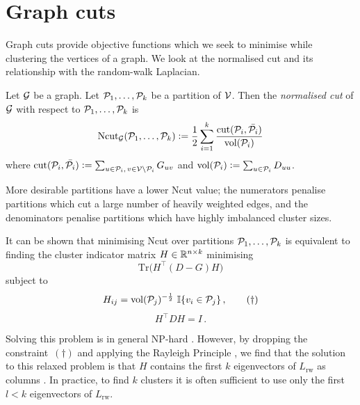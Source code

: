 \section{Graph cuts} \label{sec:spectral_graph_cut}

Graph cuts provide objective functions which we seek to minimise while clustering the vertices of a graph.
We look at the normalised cut and its relationship with the random-walk Laplacian.

\begin{definition}
Let $\mathcal{G}$ be a graph. Let $ \mathcal{P}_1, \ldots, \mathcal{P}_k $ be a partition of $\mathcal{V}$. Then the \emph{normalised cut} \cite{shi2000normalized} of $\mathcal{G}$ with respect to $ \mathcal{P}_1, \ldots, \mathcal{P}_k $ is
%
$$ \mathrm{Ncut}_{\mathcal{G}}(\mathcal{P}_1, \ldots, \mathcal{P}_k) \vcentcolon= \frac{1}{2} \sum_{i=1}^k \frac{ \mathrm{cut}(\mathcal{P}_i,\bar{\mathcal{P}_i}) }{ \mathrm{vol}(\mathcal{P}_i) } $$
%
where $ \mathrm{cut}(\mathcal{P}_i,\bar{\mathcal{P}_i}) \vcentcolon= \sum_{u \in \mathcal{P}_i, \, v \in \mathcal{V} \setminus \mathcal{P}_i} G_{uv}$ and $\mathrm{vol}(\mathcal{P}_i) \vcentcolon= \sum_{u \in \mathcal{P}_i} D_{uu}$.

\end{definition}


\begin{remark}
More desirable partitions have a lower Ncut value; the numerators penalise partitions which cut a large number of heavily weighted edges, and the denominators penalise partitions which have highly imbalanced cluster sizes.
\end{remark}


It can be shown \cite{von2007tutorial} that minimising Ncut over partitions $ \mathcal{P}_1, \ldots, \mathcal{P}_k $ is equivalent to finding the cluster indicator matrix $H \in \mathbb{R}^{n \times k}$ minimising
$$ \mathrm{Tr} \big( H^\top (D-G) H \big) $$
subject to
$$ H_{ij} = \mathrm{vol}(\mathcal{P}_j)^{-\frac{1}{2}} \ \mathbb{I} \{ v_i \in \mathcal{P}_j \}\,, \qquad (\dagger) $$
$$ H^\top D H = I\,. $$


Solving this problem is in general \textsf{NP}-hard \cite{wagner1993between}.
However, by dropping the constraint~$(\dagger)$ and applying the Rayleigh Principle \cite{lutkepohl1996handbook}, we find that the solution to this relaxed problem is that $H$ contains the first $k$ eigenvectors of $L_\mathrm{rw}$ as columns \cite{von2007tutorial}.
In practice, to find $k$ clusters it is often sufficient to use only the first $l < k$ eigenvectors of $L_\mathrm{rw}$.








